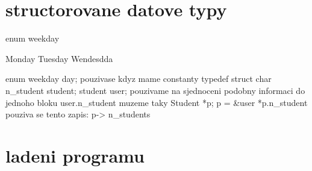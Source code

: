 \documentclass{article}
\begin{document}
\sloppy
\section{structorovane datove typy}
enum weekday {
Monday
Tuesday
Wendesdda

}
enum weekday day;
pouzivase kdyz mame constanty
typedef struct {
 char n_student
}student;
student user;
pouzivame na sjednoceni podobny informaci do jednoho bloku
user.n_student
muzeme taky Student *p;
            p = &user
            *p.n_student pouziva se tento zapis: p-> n_students
\section{ladeni programu}
\end{document}

